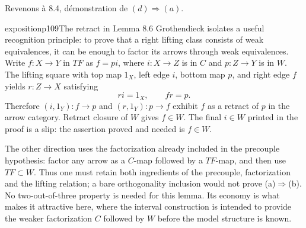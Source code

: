 Revenons à 8.4, démonstration de $(d) \Longrightarrow (a)$.




\begin{dcomment}{exposition}{p109}{The retract in Lemma 8.6}
Grothendieck isolates a useful recognition principle: to prove that a right lifting class consists of weak equivalences, it can be enough to factor its arrows through weak equivalences. Write $f:X\to Y$ in $TF$ as $f=pi$, where $i:X\to Z$ is in $C$ and $p:Z\to Y$ is in $W$. The lifting square with top map $1_X$, left edge $i$, bottom map $p$, and right edge $f$ yields $r:Z\to X$ satisfying
\[
 ri=1_X,\qquad fr=p.
\]
Therefore $(i,1_Y):f\to p$ and $(r,1_Y):p\to f$ exhibit $f$ as a retract of $p$ in the arrow category. Retract closure of $W$ gives $f\in W$. The final $i\in W$ printed in the proof is a slip: the assertion proved and needed is $f\in W$.

The other direction uses the factorization already included in the precouple hypothesis: factor any arrow as a $C$-map followed by a $TF$-map, and then use $TF\subset W$. Thus one must retain both ingredients of the precouple, factorization and the lifting relation; a bare orthogonality inclusion would not prove (a)$\Rightarrow$(b). No two-out-of-three property is needed for this lemma. Its economy is what makes it attractive here, where the interval construction is intended to provide the weaker factorization $C$ followed by $W$ before the model structure is known.
\end{dcomment}


